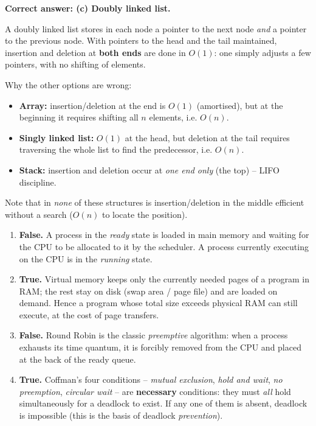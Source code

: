 \documentclass[11pt]{article}
\newcommand{\cle}[1]{{\popxbold\color{popdark}#1}}
\begin{document}
\begin{corrige}
\textbf{Correct answer: (c) Doubly linked list.}

A \cle{doubly linked list} stores in each node a pointer to the next node \emph{and} a pointer to the previous node. With pointers to the head and the tail maintained, insertion and deletion at \textbf{both ends} are done in $O(1)$: one simply adjusts a few pointers, with no shifting of elements.

Why the other options are wrong:
\begin{itemize}
\item \textbf{Array:} insertion/deletion at the end is $O(1)$ (amortised), but at the beginning it requires shifting all $n$ elements, i.e. $O(n)$.
\item \textbf{Singly linked list:} $O(1)$ at the head, but deletion at the tail requires traversing the whole list to find the predecessor, i.e. $O(n)$.
\item \textbf{Stack:} insertion and deletion occur at \emph{one end only} (the top) -- LIFO discipline.
\end{itemize}
Note that in \emph{none} of these structures is insertion/deletion in the middle efficient without a search ($O(n)$ to locate the position).
\end{corrige}

\begin{corrige}
\begin{enumerate}
\item \textbf{False.} A process in the \emph{ready} state is loaded in main memory and waiting for the CPU to be allocated to it by the scheduler. A process currently executing on the CPU is in the \emph{running} state.
\item \textbf{True.} \cle{Virtual memory} keeps only the currently needed pages of a program in RAM; the rest stay on disk (swap area / page file) and are loaded on demand. Hence a program whose total size exceeds physical RAM can still execute, at the cost of page transfers.
\item \textbf{False.} \cle{Round Robin} is the classic \emph{preemptive} algorithm: when a process exhausts its time quantum, it is forcibly removed from the CPU and placed at the back of the ready queue.
\item \textbf{True.} Coffman's four conditions -- \emph{mutual exclusion}, \emph{hold and wait}, \emph{no preemption}, \emph{circular wait} -- are \textbf{necessary} conditions: they must \emph{all} hold simultaneously for a deadlock to exist. If any one of them is absent, deadlock is impossible (this is the basis of deadlock \emph{prevention}).
\end{enumerate}
\end{corrige}
\end{document}
